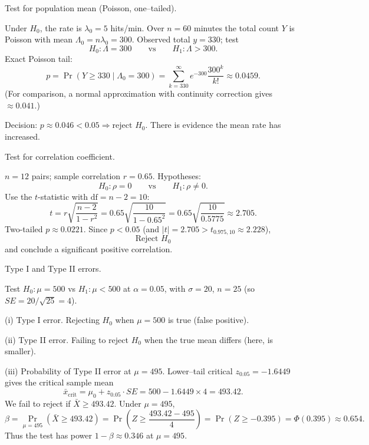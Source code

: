 \documentclass[11pt]{article}
\def\textbf#1{#1}%
\def\mathrm#1{#1}%
\begin{document}

\begin{solution}
\textbf{Test for population mean (Poisson, one–tailed).}

Under $H_0$, the rate is $\lambda_0=5$ hits/min.
Over $n=60$ minutes the total count $Y$ is Poisson with mean $\Lambda_0=n\lambda_0=300$.
Observed total $y=330$; test
\[
H_0:\Lambda=300 \qquad \text{vs} \qquad H_1:\Lambda>300.
\]
\textbf{Exact Poisson tail:}
\[
p=\Pr(Y\ge 330\mid \Lambda_0=300)=\sum_{k=330}^{\infty} e^{-300}\frac{300^{k}}{k!}\approx \boxed{0.0459}.
\]
(For comparison, a normal approximation with continuity correction gives $\approx 0.041$.)

\textbf{Decision:} $p\approx 0.046<0.05\Rightarrow \boxed{\text{reject }H_0}$.
There is evidence the mean rate has increased.
\end{solution}


\begin{solution}
\textbf{Test for correlation coefficient.}

$n=12$ pairs; sample correlation $r=0.65$. Hypotheses:
\[
H_0:\rho=0 \qquad\text{vs}\qquad H_1:\rho\neq 0.
\]
Use the $t$-statistic with $\text{df}=n-2=10$:
\[
t = r\sqrt{\frac{n-2}{1-r^2}}
= 0.65\sqrt{\frac{10}{1-0.65^2}}
= 0.65\sqrt{\frac{10}{0.5775}}
\approx 2.705.
\]
Two-tailed $p\approx 0.0221$. Since $p<0.05$ (and $|t|=2.705>t_{0.975,10}\approx 2.228$),
\[
\boxed{\text{Reject }H_0}
\]
and conclude a significant positive correlation.
\end{solution}



\begin{solution}
\textbf{Type I and Type II errors.}

Test $H_0:\mu=500$ vs $H_1:\mu<500$ at $\alpha=0.05$, with $\sigma=20$, $n=25$ (so $\mathrm{SE}=20/\sqrt{25}=4$).

\textbf{(i) Type I error.} Rejecting $H_0$ when $\mu=500$ is true (false positive).

\textbf{(ii) Type II error.} Failing to reject $H_0$ when the true mean differs (here, is smaller). 

\textbf{(iii) Probability of Type II error at $\mu=495$.}
Lower–tail critical $z_{0.05}=-1.6449$ gives the critical sample mean
\[
\bar x_{\text{crit}}=\mu_0+z_{0.05}\cdot \mathrm{SE}
=500-1.6449\times 4=\boxed{493.42}.
\]
We fail to reject if $\bar X\ge 493.42$. Under $\mu=495$,
\[
\beta=\Pr_{\mu=495}(\bar X\ge 493.42)
= \Pr\!\left(Z\ge \frac{493.42-495}{4}\right)
=\Pr(Z\ge -0.395)=\Phi(0.395)\approx \boxed{0.654}.
\]
Thus the test has power $1-\beta\approx \boxed{0.346}$ at $\mu=495$.
\end{solution}
\end{document}
